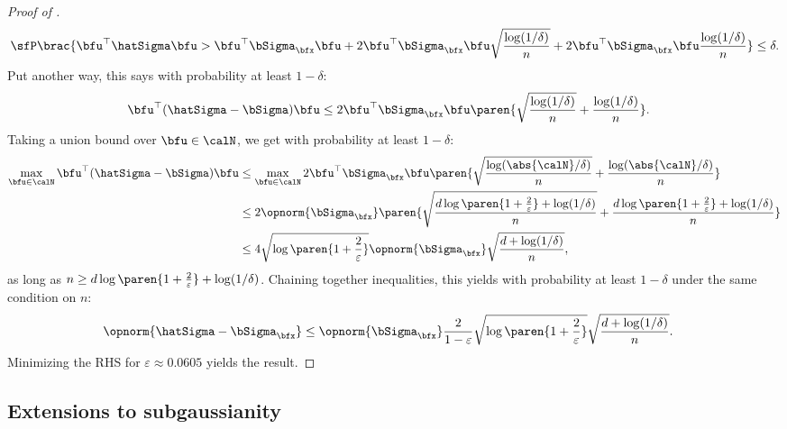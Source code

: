 \begin{proof}[Proof of ]
    \begin{align*}
        \sfP\brac{\bfu^\top \hatSigma \bfu > \bfu^\top \bSigma_\bfx \bfu + 2\bfu^\top \bSigma_\bfx \bfu \sqrt{\frac{\log(1/\delta)}{n}} + 2\bfu^\top \bSigma_\bfx \bfu \frac{\log(1/\delta)}{n}} \leq \delta.
    \end{align*}
    Put another way, this says with probability at least $1 - \delta$:
    \begin{align*}
        \bfu^\top(\hatSigma-\bSigma) \bfu &\leq 2\bfu^\top \bSigma_\bfx \bfu \paren{\sqrt{\frac{\log(1/\delta)}{n}} + \frac{\log(1/\delta)}{n}}.
    \end{align*}
    Taking a union bound over $\bfu \in \calN$, we get with probability at least $1 - \delta$:
    \begin{align*}
        \max_{\bfu \in \calN} \bfu^\top(\hatSigma-\bSigma) \bfu &\leq \max_{\bfu \in \calN} 2\bfu^\top \bSigma_\bfx \bfu \paren{\sqrt{\frac{\log(\abs{\calN}/\delta)}{n}} + \frac{\log(\abs{\calN}/\delta)}{n}} \\
        &\leq 2 \opnorm{\bSigma_\bfx} \paren{\sqrt{\frac{d\log\paren{1 + \frac{2}{\varepsilon}}+\log(1/\delta)}{n}} + \frac{d\log\paren{1 + \frac{2}{\varepsilon}} + \log(1/\delta)}{n}} \\
        &\leq 4 \sqrt{\log\paren{1 + \frac{2}{\varepsilon}}} \opnorm{\bSigma_\bfx} \sqrt{\frac{d + \log(1/\delta)}{n}},
    \end{align*}    
    as long as $n \geq d\log\paren{1 + \frac{2}{\varepsilon}}+\log(1/\delta)$.
    Chaining together inequalities, this yields with probability at least $1 - \delta$ under the same condition on $n$:
    \begin{align*}
        \opnorm{\hatSigma - \bSigma_\bfx} &\leq \opnorm{\bSigma_\bfx}\frac{2}{1 - \varepsilon}\sqrt{\log\paren{1 + \frac{2}{\varepsilon}}} \sqrt{\frac{d + \log(1/\delta)}{n}}.
    \end{align*}
    Minimizing the RHS for $\varepsilon \approx 0.0605$ yields the result.
\end{proof}


\subsection{Extensions to subgaussianity}\label{appdx:subgaussian}

